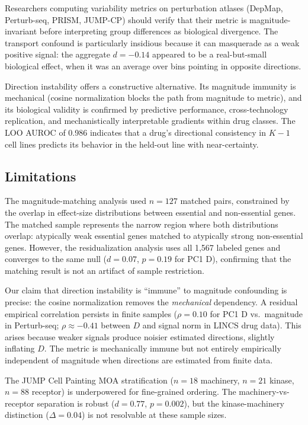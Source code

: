 \documentclass[11pt]{article}
\begin{document}
Researchers computing variability metrics on perturbation atlases
(DepMap, Perturb-seq, PRISM, JUMP-CP) should verify that their metric is
magnitude-invariant before interpreting group differences as biological
divergence. The transport confound is particularly insidious because it
can masquerade as a weak positive signal: the aggregate $d = -0.14$
appeared to be a real-but-small biological effect, when it was an
average over bins pointing in opposite directions.

Direction instability offers a constructive alternative. Its magnitude
immunity is mechanical (cosine normalization blocks the path from
magnitude to metric), and its biological validity is confirmed by
predictive performance, cross-technology replication, and mechanistically
interpretable gradients within drug classes. The LOO AUROC of 0.986
indicates that a drug's directional consistency in $K-1$ cell lines
predicts its behavior in the held-out line with near-certainty.

\subsection{Limitations}

The magnitude-matching analysis used $n = 127$ matched pairs,
constrained by the overlap in effect-size distributions between
essential and non-essential genes. The matched sample represents the
narrow region where both distributions overlap: atypically weak essential
genes matched to atypically strong non-essential genes. However, the
residualization analysis uses all 1{,}567 labeled genes and converges to
the same null ($d = 0.07$, $p = 0.19$ for PC1 D), confirming that the
matching result is not an artifact of sample restriction.

Our claim that direction instability is ``immune'' to magnitude
confounding is precise: the cosine normalization removes the
\emph{mechanical} dependency. A residual empirical correlation persists
in finite samples ($\rho = 0.10$ for PC1 D vs.\ magnitude in
Perturb-seq; $\rho \approx -0.41$ between $D$ and signal norm in LINCS
drug data). This arises because weaker signals produce noisier estimated
directions, slightly inflating $D$. The metric is mechanically immune but
not entirely empirically independent of magnitude when directions are
estimated from finite data.

The JUMP Cell Painting MOA stratification ($n = 18$ machinery, $n = 21$
kinase, $n = 88$ receptor) is underpowered for fine-grained ordering.
The machinery-vs-receptor separation is robust ($d = 0.77$, $p =
0.002$), but the kinase-machinery distinction ($\Delta = 0.04$) is not
resolvable at these sample sizes.
\end{document}
